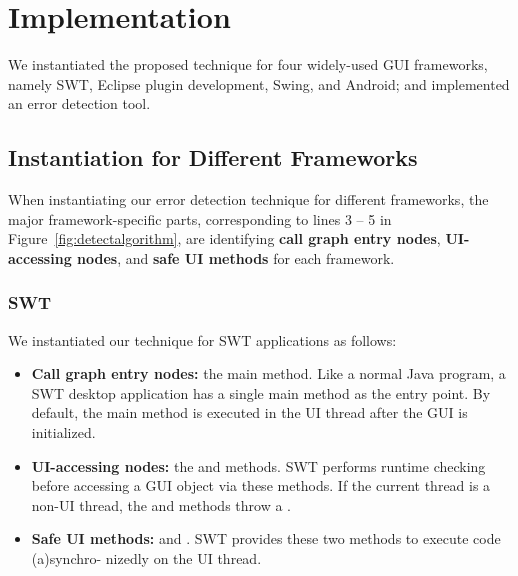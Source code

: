 
\tinystep
\tinystep
\section{Implementation}
\label{sec:implementation}

We instantiated the proposed technique for four widely-used
GUI frameworks, namely SWT, Eclipse plugin development, Swing, and Android;
and implemented an error detection tool.



\tinystep


\subsection{Instantiation for Different Frameworks}
\label{sec:platforms}

When instantiating our error detection technique for different
frameworks, the major framework-specific parts, corresponding to
lines 3 -- 5 in Figure~\ref{fig:detectalgorithm}, are identifying
\textbf{call graph entry nodes}, \textbf{UI-accessing nodes},
and \textbf{safe UI methods} for each framework.

\tinystep
\subsubsection{SWT}

 We instantiated our technique for SWT applications as follows:

\begin{itemize}
\smallstep

\item \textbf{Call graph entry nodes: } the main method. Like a normal Java program,
a SWT desktop application has a single main method as the entry point. By default,
the main method is executed in the UI thread after the GUI
is initialized.

\smallstep

\item \textbf{UI-accessing nodes: } the 
and   methods. SWT performs
runtime checking before accessing a GUI object via these methods.
If the current thread is a non-UI thread, the 
and  methods throw a .

\smallstep

\item \textbf{Safe UI methods: } 
and . SWT provides these two methods
to execute code (a)synchro- nizedly on the UI thread.

\end{itemize}

